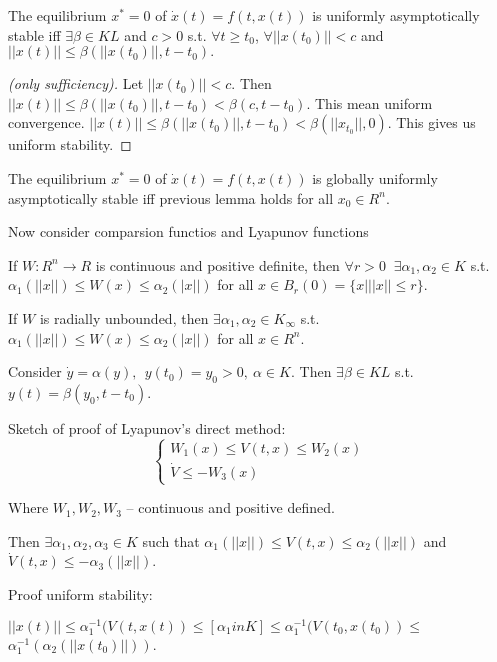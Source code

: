 \begin{Lemma}
 The equilibrium $x^*=0$ of $\dot x(t)=f(t,x(t))$ is uniformly asymptotically stable iff
 $\exists \beta\in KL$ and $c>0$ s.t. $\forall t \ge t_0$,
 $\forall ||x(t_0)||<c$ and $||x(t)|| \le \beta(||x(t_0)||, t-t_0).$ 

 \begin{proof}[(only sufficiency)] Let $||x(t_0)||<c$. Then 
 $||x(t)|| \le \beta(||x(t_0)||, t-t_0) < \beta(c,t-t_0)$. This mean uniform convergence.
 $||x(t)||\le\beta(||x(t_0)||, t-t_0)<\beta(||x_{t_0}||, 0)$. This gives us uniform
 stability.
 \end{proof}
\end{Lemma}

\begin{Lemma}
 The equilibrium $x^*=0$ of $\dot x(t)=f(t,x(t))$ is globally uniformly asymptotically 
 stable iff previous lemma holds for all $x_0\in R^n$.
\end{Lemma}

Now consider comparsion functios and Lyapunov functions

If $W:R^n \to R$ is continuous and positive definite, then $\forall r>0\ $
$\exists \alpha_1, \alpha_2 \in K$ s.t. $\alpha_1(||x||) \le W(x)\le \alpha_2(|x||)$ for 
all $x\in B_r(0)=\{x|||x||\le r\}$.

If $W$ is radially unbounded, then $\exists \alpha_1,\alpha_2\in K_\infty$ s.t.
$\alpha_1(||x||) \le W(x)\le\alpha_2(|x||)$ for all $x\in R^n$.

\begin{Lemma}[Auxility]
 Consider $\dot y=\alpha(y),\ \ y(t_0)=y_0>0, \ \alpha\in K$. Then 
 $\exists \beta\in KL$ s.t. $y(t)=\beta(y_0, t-t_0)$.
\end{Lemma}

Sketch of proof of Lyapunov's direct method:
\begin{equation*}
\begin{cases}
 W_1(x)\le V(t,x) \le W_2(x) \\
 \dot V \le -W_3(x)
\end{cases}
\end{equation*}


Where $W_1, W_2, W_3$ -- continuous and positive defined.

Then $\exists \alpha_1,\alpha_2,\alpha_3\in K$ such that 
$\alpha_1(||x||)\le V(t,x)\le \alpha_2(||x||)$ and $\dot V(t,x)\le -\alpha_3(||x||)$.

Proof uniform stability:

$||x(t)||\le\alpha^{-1}_1(V(t,x(t)) \le [\alpha_1 in K] \le \alpha^{-1}_1(V(t_0,x(t_0)) \le$
$\alpha^{-1}_1(\alpha_2(||x(t_0)||))$.

